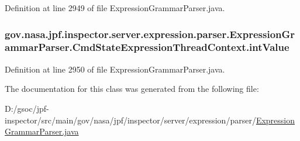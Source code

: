 Definition at line 2949 of file Expression\+Grammar\+Parser.\+java.

\subsubsection[{\texorpdfstring{int\+Value}{intValue}}]{ gov.\+nasa.\+jpf.\+inspector.\+server.\+expression.\+parser.\+Expression\+Grammar\+Parser.\+Cmd\+State\+Expression\+Thread\+Context.\+int\+Value}\hypertarget{classgov_1_1nasa_1_1jpf_1_1inspector_1_1server_1_1expression_1_1parser_1_1_expression_grammar_paf34f6c6cf6d3cef851c12971caa03ed5_ae3d89c3d9319f1ed4bcc7a333e7f29d9}{}\label{classgov_1_1nasa_1_1jpf_1_1inspector_1_1server_1_1expression_1_1parser_1_1_expression_grammar_paf34f6c6cf6d3cef851c12971caa03ed5_ae3d89c3d9319f1ed4bcc7a333e7f29d9}


Definition at line 2950 of file Expression\+Grammar\+Parser.\+java.



The documentation for this class was generated from the following file\+:\begin{DoxyCompactItemize}
\item 
D\+:/gsoc/jpf-\/inspector/src/main/gov/nasa/jpf/inspector/server/expression/parser/\hyperlink{_expression_grammar_parser_8java}{Expression\+Grammar\+Parser.\+java}\end{DoxyCompactItemize}
